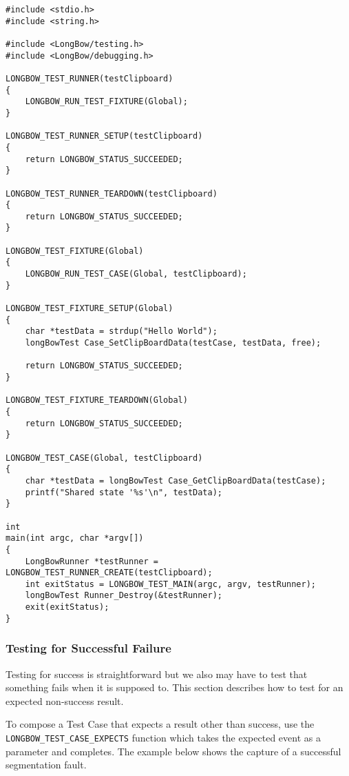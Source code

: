 \documentclass[12pt]{article} %
\begin{document}
\begin{lstlisting}
#include <stdio.h>
#include <string.h>

#include <LongBow/testing.h>
#include <LongBow/debugging.h>

LONGBOW_TEST_RUNNER(testClipboard)
{
    LONGBOW_RUN_TEST_FIXTURE(Global);
}

LONGBOW_TEST_RUNNER_SETUP(testClipboard)
{
    return LONGBOW_STATUS_SUCCEEDED;
}

LONGBOW_TEST_RUNNER_TEARDOWN(testClipboard)
{
    return LONGBOW_STATUS_SUCCEEDED;
}

LONGBOW_TEST_FIXTURE(Global)
{
    LONGBOW_RUN_TEST_CASE(Global, testClipboard);
}

LONGBOW_TEST_FIXTURE_SETUP(Global)
{
    char *testData = strdup("Hello World");
    longBowTest Case_SetClipBoardData(testCase, testData, free);
    
    return LONGBOW_STATUS_SUCCEEDED;
}

LONGBOW_TEST_FIXTURE_TEARDOWN(Global)
{
    return LONGBOW_STATUS_SUCCEEDED;
}

LONGBOW_TEST_CASE(Global, testClipboard)
{
    char *testData = longBowTest Case_GetClipBoardData(testCase);
    printf("Shared state '%s'\n", testData);
}

int
main(int argc, char *argv[])
{
    LongBowRunner *testRunner = LONGBOW_TEST_RUNNER_CREATE(testClipboard);
    int exitStatus = LONGBOW_TEST_MAIN(argc, argv, testRunner);
    longBowTest Runner_Destroy(&testRunner);
    exit(exitStatus);
}
\end{lstlisting}

\subsubsection {Testing for Successful Failure}
Testing for success is straightforward but we also may have to test that something fails when it is supposed to. 
This section describes how to test for an expected non-success result.

To compose a Test Case that expects a result other than success, use the {\tt LONGBOW\_TEST\_CASE\_EXPECTS} function which takes the expected event as a parameter and completes.  The example below shows the capture of a successful segmentation fault.
  
\end{document}
